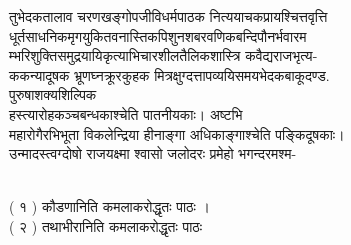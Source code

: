 \documentclass[11pt, openany]{book}
\begin{document}
{{{{{{{{{{{तुभेदकतालाव चरणखङ्गोपजीविधर्मपाठक नित्ययाचकप्रायश्चित्तवृत्ति\\
धूर्तसाधनिकमृगयुकितवनास्तिकपिशुनशबरवणिकबन्दिपौनर्भवारम\\
म्भरिशुक्तिसमुद्रयायिकृत्याभिचारशीलतैलिकशास्त्रि कवैद्यराजभृत्य-\\
ककन्यादूषक भ्रूणघ्नक्रूरकुहक मित्रक्षुग्दत्तापव्ययिसमयभेदकबाकूदण्ड.\\
पुरुषाशक्यशिल्पिक\\
हस्त्यारोहकञ्चबन्धकाश्चेति पातनीयकाः। अष्टभि\\
महारोगैरभिभूता विकलेन्द्रिया हीनाङ्गा अधिकाङ्गाश्चेति पङ्किदूषकाः।\\
उन्मादस्त्वग्दोषो राजयक्ष्मा श्वासो जलोदरः प्रमेहो भगन्दरमश्म-


{\\
( १ ) कौडणानिति कमलाकरोद्धृतः पाठः ।\\
( २ ) तथाभीरानिति कमलाकरोद्धृतः पाठः \textbar{}}

}}}}}}}}}}}
\end{document}

